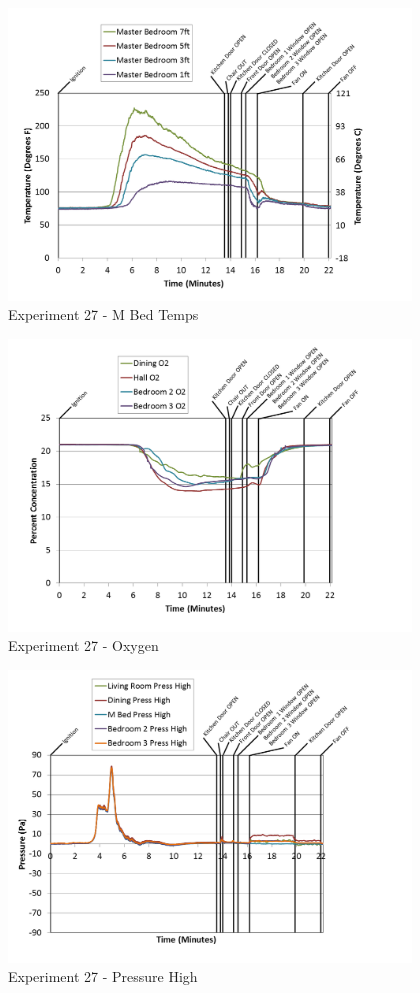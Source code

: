 \documentclass{article}
\begin{document}
\begin{appendices}
\begin{figure}[h!]
	\centering
	\includegraphics[height=3.05in]{0_Images/Results_Charts/Exp_27_Charts/MBedTemps.png}
	\caption{Experiment 27 - M Bed Temps}
\end{figure}

\clearpage

\begin{figure}[h!]
	\centering
	\includegraphics[height=3.05in]{0_Images/Results_Charts/Exp_27_Charts/Oxygen.png}
	\caption{Experiment 27 - Oxygen}
\end{figure}


\begin{figure}[h!]
	\centering
	\includegraphics[height=3.05in]{0_Images/Results_Charts/Exp_27_Charts/PressureHigh.png}
	\caption{Experiment 27 - Pressure High}
\end{figure}


\end{appendices}
\end{document}
